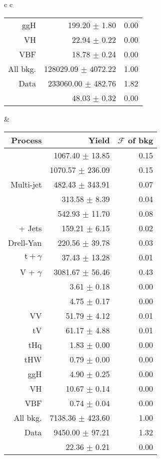 \begin{table} [h!]
\begin{tabular}{c c}
\begin{tabular}{ r || r | r}
			ggH & 199.20 $\pm$ 1.80 & 0.00 \\
            VH & 22.94 $\pm$ 0.22 & 0.00 \\
            VBF & 18.78 $\pm$ 0.24 & 0.00 \\ 
            All bkg. & 128029.09 $\pm$ 4072.22 & 1.00 \\ \hline 
            Data & 233060.00 $\pm$ 482.76 & 1.82 \\ \hline 
			\ttH & 48.03 $\pm$ 0.32 & 0.00 \\  \hline \hline
		\end{tabular}    
		&
		\begin{tabular}{ r || r | r} \hline \hline
			Process & Yield & $\mathcal F$ of bkg \\ \hline
            \dipho & 1067.40 $\pm$ 13.85 & 0.15 \\ 
			\gjets & 1070.57 $\pm$ 236.09 & 0.15 \\ 
			Multi-jet & 482.43 $\pm$ 343.91 & 0.07 \\ 
			\ttgg & 313.58 $\pm$ 8.39 & 0.04 \\ 
			\ttg & 542.93 $\pm$ 11.70 & 0.08 \\ 
			\ttb + Jets & 159.21 $\pm$ 6.15 & 0.02 \\ 
			Drell-Yan & 220.56 $\pm$ 39.78 & 0.03 \\ 
            $\text{t} + \gamma$ & 37.43 $\pm$ 13.28 & 0.01 \\ 
			V + $\gamma$ & 3081.67 $\pm$ 56.46 & 0.43 \\ 
			\ttW & 3.61 $\pm$ 0.18 & 0.00 \\ 
			\ttZ & 4.75 $\pm$ 0.17 & 0.00 \\ 
			VV & 51.79 $\pm$ 4.12 & 0.01 \\ 
			tV & 61.17 $\pm$ 4.88 & 0.01 \\  \hline
			tHq & 1.83 $\pm$ 0.00 & 0.00 \\ 
            tHW & 0.79 $\pm$ 0.00 & 0.00 \\ 
			ggH & 4.90 $\pm$ 0.25 & 0.00 \\ 
            VH & 10.67 $\pm$ 0.14 & 0.00 \\ 
            VBF & 0.74 $\pm$ 0.04 & 0.00 \\ \hline 
			All bkg. & 7138.36 $\pm$ 423.60 & 1.00 \\ \hline
			Data & 9450.00 $\pm$ 97.21 & 1.32 \\ \hline
			\ttH & 22.36 $\pm$ 0.21 & 0.00 \\  \hline \hline
		\end{tabular}
    \end{tabular}
	\label{tab:tth_presel_datamc}
\end{table}

